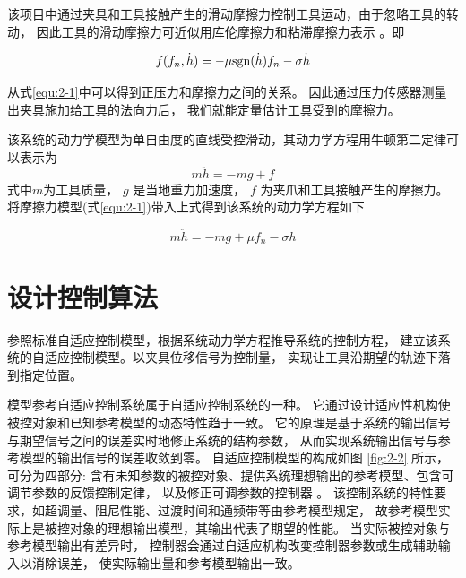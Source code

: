 该项目中通过夹具和工具接触产生的滑动摩擦力控制工具运动，由于忽略工具的转动，
因此工具的滑动摩擦力可近似用库伦摩擦力和粘滞摩擦力表示 \cite{ref9}。即

\begin{equation}
  f({f_n},\dot h) =  - \mu {\mathop{\rm sgn}} (\dot h){f_n} - \sigma \dot h
  \label{equ:2-1}
\end{equation}

\begin{note}
\end{note}

从式\ref{equ:2-1}中可以得到正压力和摩擦力之间的关系。
因此通过压力传感器测量出夹具施加给工具的法向力后，
我们就能定量估计工具受到的摩擦力。

该系统的动力学模型为单自由度的直线受控滑动，其动力学方程用牛顿第二定律可以表示为
\begin{equation}
  m\ddot h =  - mg + f
  \label{equ:2-2}
\end{equation}
\noindent 式中$m$为工具质量， $g$ 是当地重力加速度， $f$ 为夹爪和工具接触产生的摩擦力。
将摩擦力模型(式\ref{equ:2-1})带入上式得到该系统的动力学方程如下

\begin{equation}
  m\ddot h =  - mg + \mu {f_n} - \sigma \dot h
  \label{equ:2-3}
\end{equation}


\section{设计控制算法}
参照标准自适应控制模型，根据系统动力学方程推导系统的控制方程，
建立该系统的自适应控制模型。以夹具位移信号为控制量，
实现让工具沿期望的轨迹下落到指定位置。

模型参考自适应控制系统属于自适应控制系统的一种。
它通过设计适应性机构使被控对象和已知参考模型的动态特性趋于一致。
它的原理是基于系统的输出信号与期望信号之间的误差实时地修正系统的结构参数，
从而实现系统输出信号与参考模型的输出信号的误差收敛到零。
自适应控制模型的构成如图 \ref{fig:2-2} 所示，可分为四部分:
含有未知参数的被控对象、提供系统理想输出的参考模型、包含可调节参数的反馈控制定律，
以及修正可调参数的控制器 \cite{ref10} 。
该控制系统的特性要求，如超调量、阻尼性能、过渡时间和通频带等由参考模型规定，
故参考模型实际上是被控对象的理想输出模型，其输出代表了期望的性能。
当实际被控对象与参考模型输出有差异时，
控制器会通过自适应机构改变控制器参数或生成辅助输入以消除误差，
使实际输出量和参考模型输出一致。


